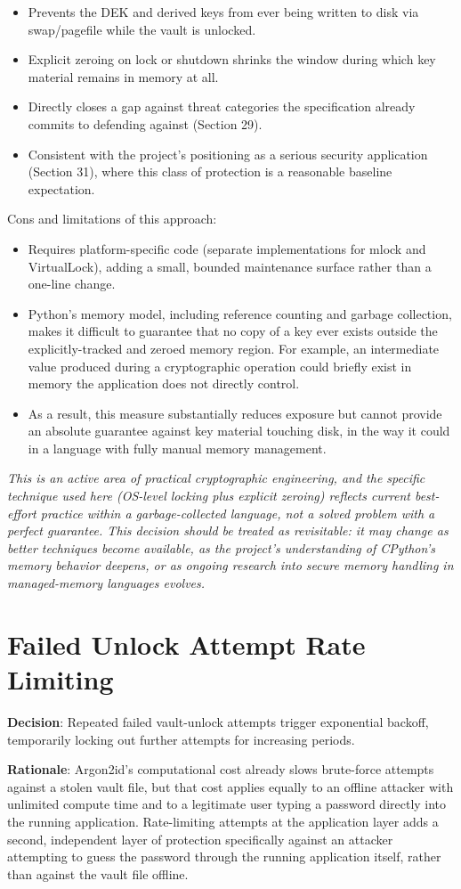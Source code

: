 \begin{itemize}
	\item Prevents the DEK and derived keys from ever being written to disk via swap/pagefile while the vault is unlocked.
	\item Explicit 	zeroing on lock or shutdown shrinks the window during which key material remains in memory at all.
	\item Directly 	closes a gap against threat categories the specification already 	commits to defending against (Section 29).
	\item Consistent with the project's positioning as a serious security application (Section 31), where this class of protection is a reasonable 	baseline expectation.
\end{itemize}
Cons and limitations of this approach:
\begin{itemize}
	\item Requires platform-specific code (separate implementations for mlock and VirtualLock), adding a small, bounded maintenance surface rather than a one-line change.
	\item Python's memory model, including reference counting and garbage collection, makes it difficult to guarantee that no copy of a key ever exists 	outside the explicitly-tracked and zeroed memory region. For example, an intermediate value produced during a cryptographic operation could briefly exist in memory the application does not directly control.
	\item As a result, this measure substantially reduces exposure but cannot provide an absolute guarantee against key material touching disk, in the way it could in a language with fully manual memory management.
\end{itemize}

\emph{This is an active area of practical cryptographic engineering, and the specific technique used here (OS-level locking plus explicit zeroing) reflects current best-effort practice within a garbage-collected language, not a solved problem with a perfect guarantee. This decision should be treated as revisitable: it may change as better techniques become available, as the project's understanding of CPython's memory behavior deepens, or as ongoing research into secure memory handling in managed-memory languages evolves.}
\section{Failed Unlock Attempt Rate Limiting}
\textbf{Decision}: Repeated failed vault-unlock attempts trigger exponential backoff, temporarily locking out further attempts for increasing periods.

\textbf{Rationale}: Argon2id's computational cost already slows brute-force attempts against a stolen vault file, but that cost applies equally to an offline attacker with unlimited compute time and to a legitimate user typing a password directly into the running application. Rate-limiting attempts at the application layer adds a second, independent layer of protection specifically against an attacker attempting to guess the password through the running application itself, rather than against the vault file offline.


\sentinelchapterend